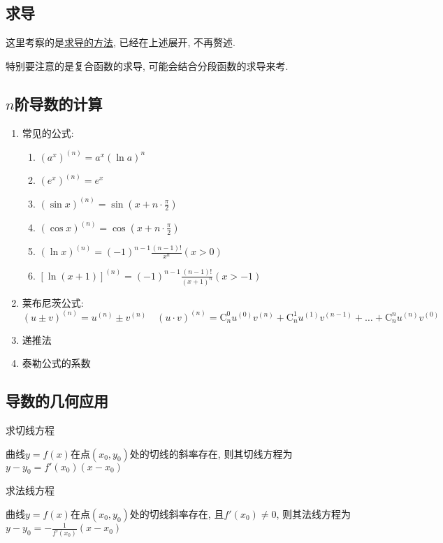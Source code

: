 \subsection{求导}
这里考察的是\hyperref[求导的方法]{求导的方法}, 已经在上述展开, 不再赘述.\par
特别要注意的是复合函数的求导, 可能会结合分段函数的求导来考. 
\subsection{$ n $阶导数的计算}
\begin{enumerate}
\item 常见的公式:
\begin{enumerate}
\item $ (a^{x})^{(n)}=a^{x}(\ln a)^{n} $
\item $ (e^{x})^{(n)}=e^{x} $
\item $ (\sin x)^{(n)}=\sin (x+n\cdot \frac{\pi}{2}) $
\item $ (\cos x)^{(n)}=\cos (x+n\cdot \frac{\pi}{2}) $
\item $ (\ln x)^{(n)}=(-1)^{n-1}\frac{(n-1)!}{x^{n}}(x>0) $
\item $ [\ln (x+1)]^{(n)}=(-1)^{n-1}\frac{(n-1)!}{(x+1)^{n}}(x>-1) $
\end{enumerate}
\item 莱布尼茨公式:
\begin{equation*}
(u\pm v)^{(n)}=u^{(n)}\pm v^{(n)}\quad (u\cdot v)^{(n)}=\mathrm{C}_{n}^{0}u^{(0)}v^{(n)}+\mathrm{C}_{n}^{1}u^{(1)}v^{(n-1)}+\dots+\mathrm{C}_{n}^{n}u^{(n)}v^{(0)}
\end{equation*}
\item 递推法
\item 泰勒公式的系数
\end{enumerate}
\subsection{导数的几何应用}
{\kaishu 求切线方程} \par \vspace{.5em}
曲线$ y=f(x) $在点$ (x_{0}, y_{0}) $处的切线的斜率存在, 则其切线方程为$ y-y_{0}=f'(x_{0})(x-x_{0}) $ \par \vspace{.5em}
{\kaishu 求法线方程} \par \vspace{.5em}
曲线$ y=f(x) $在点$ (x_{0}, y_{0}) $处的切线斜率存在, 且$ f'(x_{0})\neq 0 $, 则其法线方程为$ y-y_{0}=-\frac{1}{f'(x_{0})}(x-x_{0}) $ \par \vspace{.5em}
